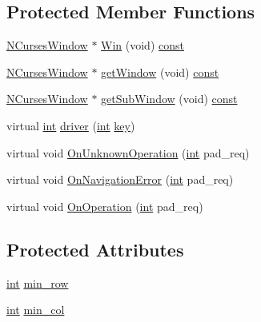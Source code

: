 \subsection*{Protected Member Functions}
\begin{DoxyCompactItemize}
\item 
\hyperlink{class_n_curses_window}{N\-Curses\-Window} $\ast$ \hyperlink{class_n_curses_pad_a2d8a3942ade1ea8354ab1b0ef62883d0}{Win} (void) \hyperlink{term__entry_8h_a57bd63ce7f9a353488880e3de6692d5a}{const} 
\item 
\hyperlink{class_n_curses_window}{N\-Curses\-Window} $\ast$ \hyperlink{class_n_curses_pad_a1398dab9179307c138b3d3f46ebfd7fe}{get\-Window} (void) \hyperlink{term__entry_8h_a57bd63ce7f9a353488880e3de6692d5a}{const} 
\item 
\hyperlink{class_n_curses_window}{N\-Curses\-Window} $\ast$ \hyperlink{class_n_curses_pad_a9547eac91ca66e9ced882521811d884f}{get\-Sub\-Window} (void) \hyperlink{term__entry_8h_a57bd63ce7f9a353488880e3de6692d5a}{const} 
\item 
virtual \hyperlink{term__entry_8h_ad65b480f8c8270356b45a9890f6499ae}{int} \hyperlink{class_n_curses_pad_affc124960bec33989e3a48fa74d4039c}{driver} (\hyperlink{term__entry_8h_ad65b480f8c8270356b45a9890f6499ae}{int} \hyperlink{unionkey}{key})
\item 
virtual void \hyperlink{class_n_curses_pad_aaef29fce270aa0a7d64fe8ea22b47fe0}{On\-Unknown\-Operation} (\hyperlink{term__entry_8h_ad65b480f8c8270356b45a9890f6499ae}{int} pad\-\_\-req)
\item 
virtual void \hyperlink{class_n_curses_pad_a39db8a92c230519452d46b91af8e7056}{On\-Navigation\-Error} (\hyperlink{term__entry_8h_ad65b480f8c8270356b45a9890f6499ae}{int} pad\-\_\-req)
\item 
virtual void \hyperlink{class_n_curses_pad_a8da76a70ce153214c275c0741ea7cdfb}{On\-Operation} (\hyperlink{term__entry_8h_ad65b480f8c8270356b45a9890f6499ae}{int} pad\-\_\-req)
\end{DoxyCompactItemize}
\subsection*{Protected Attributes}
\begin{DoxyCompactItemize}
\item 
\hyperlink{term__entry_8h_ad65b480f8c8270356b45a9890f6499ae}{int} \hyperlink{class_n_curses_pad_a6115be549d8b7bfdb24dcf8a740faf97}{min\-\_\-row}
\item 
\hyperlink{term__entry_8h_ad65b480f8c8270356b45a9890f6499ae}{int} \hyperlink{class_n_curses_pad_ac636d841416a8a7357d050818be1f609}{min\-\_\-col}
\end{DoxyCompactItemize}
